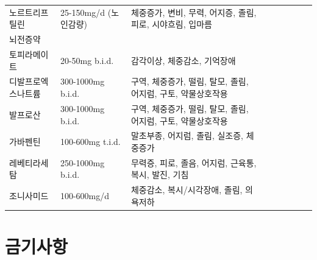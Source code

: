 \documentclass[]{book}
\begin{document}
\begin{longtable}{lllllllll}
노르트리프틸린 & 25-150mg/d (노인감량) & 체중증가, 변비, 무력, 어지증, 졸림, 피로, 시야흐림, 입마름\\
뇌전증약 &  & \\
\addlinespace
토피라메이트 & 20-50mg b.i.d. & 감각이상, 체중감소, 기억장애\\
디발프로엑스나트륨 & 300-1000mg b.i.d. & 구역, 체중증가, 떨림, 탈모, 졸림, 어지럼, 구토, 약물상호작용\\
발프로산 & 300-1000mg b.i.d. & 구역, 체중증가, 떨림, 탈모, 졸림, 어지럼, 구토, 약물상호작용\\
가바펜틴 & 100-600mg t.i.d. & 말초부종, 어지럼, 졸림, 실조증, 체중증가\\
레베티라세탐 & 250-1000mg b.i.d. & 무력증, 피로, 졸음, 어지럼, 근육통, 복시, 발진, 기침\\
\addlinespace
조니사미드 & 100-600mg/d & 체중감소, 복시/시각장애, 졸림, 의욕저하\\
\bottomrule
\end{longtable}

\hypertarget{section-25}{%
\section{금기사항}\label{section-25}}
\end{document}
